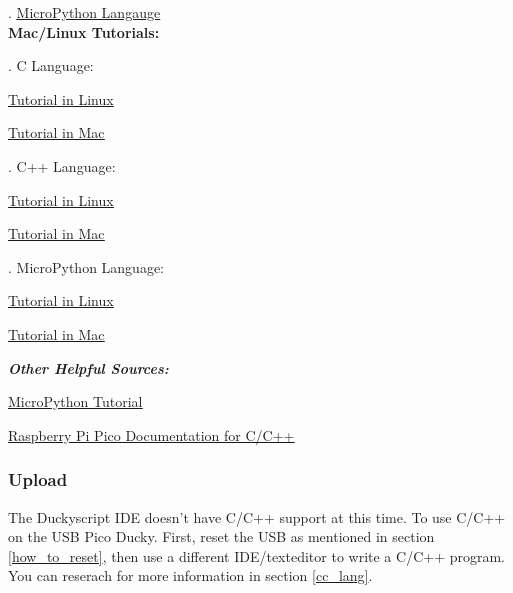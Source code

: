 \documentclass[a4paper,12pt]{article}
\begin{document}
\indent{}. \underline{\href{https://how2electronics.com/raspberry-pi-pico-getting-started-tutorial-with-micropython/}{MicroPython Langauge}}\\

\textbf{Mac/Linux Tutorials:}

\indent{}. C Language:
\begin{description}
	\setlength{\itemindent}{3em}
	\item[$\bullet$] \underline{\href{https://www.electronicshub.org/program-raspberry-pi-pico-using-c/}{Tutorial in Linux}}
	\item[$\bullet$] \underline{\href{https://blog.smittytone.net/2021/02/02/program-raspberry-pi-pico-c-mac/}{Tutorial in Mac}}
\end{description}

\indent{}. C++ Language:
\begin{description}
	\setlength{\itemindent}{3em}
	\item[$\bullet$]\underline{\href{https://circuitdigest.com/microcontroller-projects/how-to-program-raspberry-pi-pico-using-c}{Tutorial in Linux}}
	\item[$\bullet$]\underline{\href{https://www.peterzimon.com/raspberry-pi-pico-mac-c-getting-started/}{Tutorial in Mac}}
\end{description}

\indent{}. MicroPython Language:
\begin{description}
	\setlength{\itemindent}{3em}
	\item[$\bullet$]\underline{\href{https://circuitdigest.com/microcontroller-projects/getting-started-with-raspberry-pi-pico-with-micropython}{Tutorial in Linux}}
	\item[$\bullet$]\underline{\href{https://desertbot.io/blog/raspberry-pi-pico-setup-mac}{Tutorial in Mac}}
\end{description}

\large
\emph{\textbf{Other Helpful Sources:}}
\normalsize
\begin{description}
	\setlength{\itemindent}{3em}
	\item[$\bullet$] \underline{\href{https://how2electronics.com/raspberry-pi-pico-getting-started-tutorial-with-micropython/}{MicroPython Tutorial}}
	\item[$\bullet$] \underline{\href{https://www.raspberrypi.com/documentation/microcontrollers/c_sdk.html}{Raspberry Pi Pico Documentation for C/C++}}
\end{description}

\subsubsection{Upload}

The Duckyscript IDE doesn't have C/C++ support at this time. To use C/C++ on the USB Pico Ducky. First, reset the USB as mentioned in section \ref{how_to_reset}, then use a different IDE/texteditor to write a C/C++ program. You can reserach for more information in section \ref{cc_lang}.


\newpage
\end{document}
